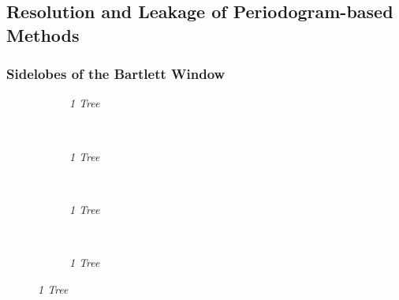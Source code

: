 \documentclass[./main.tex]{subfiles}
\begin{document}
	
\subsection{Resolution and Leakage of Periodogram-based Methods}

\subsubsection{Sidelobes of the Bartlett Window}

\begin{figure}[h]
	\centering
	\begin{subfigure}[b]{0.22\textwidth}
		\resizebox{\textwidth}{!}{}
		\caption{\textit{1 Tree}}
	\end{subfigure}
	~ %
	\begin{subfigure}[b]{0.22\textwidth}
		\resizebox{\textwidth}{!}{}
		\caption{\textit{1 Tree}}
	\end{subfigure}
	~ %
	\begin{subfigure}[b]{0.22\textwidth}
		\resizebox{\textwidth}{!}{}
		\caption{\textit{1 Tree}}
	\end{subfigure}
	~ %
	\begin{subfigure}[b]{0.22\textwidth}
		\resizebox{\textwidth}{!}{}
		\caption{\textit{1 Tree}}
	\end{subfigure}
\end{figure}

\begin{minipage}{.5\textwidth}
		\center
		\resizebox{\textwidth}{!}{}
		\label{fig:}
\end{minipage}
\begin{minipage}{.5\textwidth}
	\center
	\resizebox{\textwidth}{!}{}
	\label{fig:}
\end{minipage}
\end{document}
